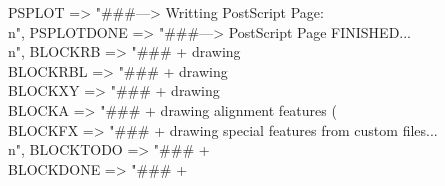 \documentclass[11pt]{article}
\def\nwendcode{\endtrivlist \endgroup} %
\let\nwdocspar=\par                    %
\begin{document}
\nwenddocs{}\plusendmoddef
PSPLOT =>
  "###---> Writting PostScript Page:\\n",
PSPLOTDONE =>
  "###---> PostScript Page FINISHED...\\n",
BLOCKRB =>
  "###       + drawing \\%
BLOCKRBL =>
  "###       + drawing \\%
BLOCKXY =>
  "###       + drawing \\%
BLOCKA =>
  "###       + drawing alignment features (\\%
BLOCKFX =>
  "###       + drawing special features from custom files...\\n",
BLOCKTODO =>
  "###     + \\%
BLOCKDONE =>
  "###       + \\%
\nwendcode{}\nwdocspar

\end{document}
